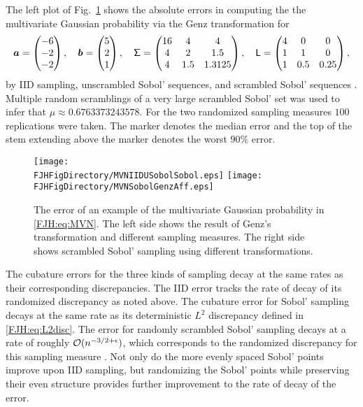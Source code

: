 \documentclass[graybox,footinfo]{svmult}
\begin{document}
The left plot of Fig.\ \ref{FJH:fig:MVNfig} shows the absolute errors in computing the the 
multivariate 
Gaussian probability via the Genz transformation for 
\[
   {\boldsymbol{a}}  = \begin{pmatrix}
   -6 \\ -2 \\ -2
   \end{pmatrix}, \quad
      {\boldsymbol{b}}  = \begin{pmatrix}
   5 \\ 2 \\ 1
   \end{pmatrix}, \quad
   \mathsf{\Sigma} = \begin{pmatrix} 16 & 4 & 4 \\ 4 &  2 &  1.5 \\
  4 & 1.5 &  1.3125 \end{pmatrix}, \quad
   \mathsf{L} = \begin{pmatrix} 4 & 0 & 0 \\ 1 &  1 &  0 \\
1 & 0.5 &  0.25 \end{pmatrix}, 
\]
by IID sampling, unscrambled Sobol' sequences, and scrambled Sobol' sequences   
\cite{Owe95, Owe98c}.
Multiple random scramblings of a very large scrambled Sobol' set was used to infer that 
$\mu \approx 0.6763373243578$.   For the two randomized sampling measures $100$ 
replications were taken.  The marker denotes the median error and the top of the stem 
extending above the marker denotes the worst $90\%$ error.

\begin{figure}
	\centering
	\texttt{[image: \\FJHFigDirectory/MVNIIDUSobolSobol.eps]} 
	\qquad 
	\texttt{[image: \\FJHFigDirectory/MVNSobolGenzAff.eps]}
	\caption{The error of an example of the multivariate Gaussian probability in 
	\eqref{FJH:eq:MVN}.  The left side shows the result of Genz's transformation and 
	different sampling measures.  The right side shows scrambled Sobol' sampling
	using different transformations.
	\label{FJH:fig:MVNfig}}
\end{figure}

The cubature errors for the three kinds of sampling decay at the same rates as their 
corresponding discrepancies.  The IID error tracks the rate of decay of its randomized 
discrepancy as noted above.  The cubature  error for  Sobol' 
sampling decays at the same rate as its deterministic $L^2$ discrepancy defined in 
\eqref{FJH:eq:L2disc}.  The error for randomly scrambled Sobol' 
sampling decays at a rate of roughly ${\mathcal{O}}(n^{-3/2+\epsilon})$, which corresponds to 
the randomized discrepancy for this sampling measure \cite{HeiHicYue02a,Owe97}.  
Not only do the more evenly spaced Sobol' points improve upon IID sampling, but 
randomizing the Sobol' points while preserving their even structure provides further 
improvement to the rate of decay of the error.
\end{document}
